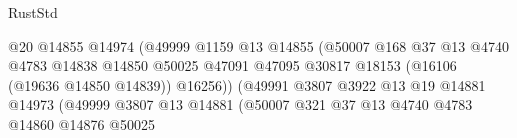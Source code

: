 \begin{lexlean}{RustStd}
\begin{coremodule}
                                                    @20
                                                    @14855
                                                    @14974
                                                    (@49999
                                                      @1159
                                                      @13
                                                      @14855
                                                      (@50007
                                                        @168
                                                        @37
                                                        @13
                                                        @4740
                                                        @4783
                                                        @14838
                                                        @14850
                                                        @50025
                                                        @47091
                                                        @47095
                                                        @30817
                                                        @18153
                                                        (@16106 (@19636 @14850 @14839))
                                                        @16256))
                                                    (@49991
                                                      @3807
                                                      @3922
                                                      @13
                                                      @19
                                                      @14881
                                                      @14973
                                                      (@49999
                                                        @3807
                                                        @13
                                                        @14881
                                                        (@50007
                                                          @321
                                                          @37
                                                          @13
                                                          @4740
                                                          @4783
                                                          @14860
                                                          @14876
                                                          @50025

\end{coremodule}
\end{lexlean}
